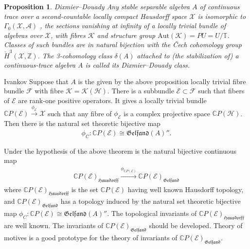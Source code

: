 \documentclass{beamer}
\theoremstyle{plain}
\newtheorem{prop}{Proposition}
\newcommand{\Z}{\mathbb{Z}}
\newcommand{\A}{\mathcal{A}}
\newcommand{\bean}{\begin{eqnarray*}}
\newcommand{\eean}{\end{eqnarray*}}
\newcommand{\Ga}{\Gamma}
\newcommand{\C}{\mathbb{C}}
\newcommand{\T}{\mathbb{T}}
\newcommand{\dl}{\delta}
\newcommand{\Aut}{\mathrm{Aut}}
\newcommand{\K}{\mathcal{K}}
\newcommand{\F}{\mathcal{F}}
\newcommand{\E}{\mathcal{E}}
\newcommand{\sH}{\mathcal{H}}       %
\newcommand{\sX}{\mathcal{X}}       %
\begin{document}
\begin{frame}
	\begin{prop}\alert{Dixmier–Douady}
		Any stable separable algebra $A$ of continuous
		trace over a second-countable locally compact Hausdorff space $\sX$ is isomorphic to
		$\Ga_0\left( \sX, \A\right)$ , the sections vanishing at infinity of a locally trivial bundle of algebras
		over $\sX$, with fibres $\K$ and structure group $\Aut(\K) = PU = U/\T$. Classes of
		such bundles are in natural bijection with the \v{C}ech cohomology group $\check{H}^3\left(\sX, \Z \right)$.
		The 3-cohomology class $\dl\left( A\right)$  attached to (the stabilization of) a continuous-trace
		algebra A is called its Dixmier–Douady class.
	\end{prop}
	\begin{theorem}\alert{Ivankov}
	Suppose that $A$ is the given by the above proposition   locally trivial   fibre bundle $\F$ with fibre $\K = \K\left(\sH \right)$. There is a subbundle $\E \subset \F$ such that fibers of $\E$ are  rank-one positive operators. It gives a locally trivial bundle $\C P\left(\E \right)\xrightarrow{\phi_\E} \sX$ such that any fibre of $\phi_\E$ is a complex projective space $\C P\left(\sH \right)$. Then there is  the natural set theoretic bijective map
\bean
\phi_C: \C P\left(\E \right)\cong  \mathfrak{Gelfand}\left(A \right)''.
\eean
\end{theorem}	
\end{frame}
\begin{frame}
Under the hypothesis of the above theorem is the natural bijective continuous map 
\bean\label{ctr_bundle_eqn}
\C P\left(\E \right)_{\mathfrak{Hausdorff}}\xrightarrow{\phi_{\C P\left( \E\right) }} \C P\left(\E \right)_{\mathfrak{Gelfand}}
\eean
where $\C P\left(\E \right)_{\mathfrak{Hausdorff}}$ is the set $\C P\left(\E \right)$ having well known Hausdorff topology, and $\C P\left(\E \right)_{\mathfrak{Gelfand}}$ has a topology induced by the natural set theoretic bijective map
$
\phi_C: \C P\left(\E \right)\cong  \mathfrak{Gelfand}\left(A \right)''.
$  The topological invariants of $\C P\left(\E \right)_{\mathfrak{Hausdorff}}$ are well known. The invariants of $\C P\left(\E \right)_{\mathfrak{Gelfand}}$ should be developed. Theory of motives is a good prototype for the theory of invariants of  $\C P\left(\E \right)_{\mathfrak{Gelfand}}$.
\end{frame}
\end{document}
